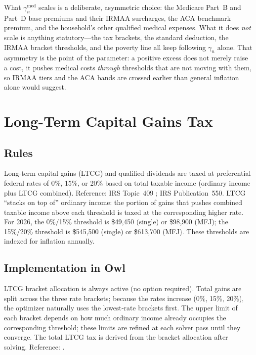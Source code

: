 \documentclass[fleqn,12pt]{report}
\begin{document}
What $\gamma^{\mathrm{med}}_n$ scales is a deliberate, asymmetric choice: the
Medicare Part~B and Part~D base premiums and their IRMAA surcharges, the ACA
benchmark premium, and the household's other qualified medical expenses.
What it does \emph{not} scale is anything statutory---the tax brackets, the
standard deduction, the IRMAA bracket thresholds, and the poverty line all keep
following $\gamma_n$ alone.
That asymmetry is the point of the parameter: a positive excess does not merely
raise a cost, it pushes medical costs \emph{through} thresholds that are not
moving with them, so IRMAA tiers and the ACA bands are crossed earlier than
general inflation alone would suggest.

\section{Long-Term Capital Gains Tax}
\label{sec:ltcg}

\subsection*{Rules}

Long-term capital gains (LTCG) and qualified dividends are taxed at
preferential federal rates of 0\%, 15\%, or 20\% based on total taxable
income (ordinary income plus LTCG combined).
Reference: IRS Topic~409 \cite{irs409}; IRS Publication~550.
LTCG ``stacks on top of'' ordinary income: the portion of gains that pushes
combined taxable income above each threshold is taxed at the corresponding
higher rate.
For 2026, the 0\%/15\% threshold is \$49,450 (single) or \$98,900 (MFJ);
the 15\%/20\% threshold is \$545,500 (single) or \$613,700 (MFJ).
These thresholds are indexed for inflation annually.

\subsection*{Implementation in Owl}

LTCG bracket allocation is always active (no option required).
Total gains are split across the three rate brackets; because the rates
increase (0\%, 15\%, 20\%), the optimizer naturally uses the lowest-rate
brackets first.
The upper limit of each bracket depends on how much ordinary income already
occupies the corresponding threshold; these limits are refined at each solver
pass until they converge.
The total LTCG tax is derived from the bracket allocation after solving.
Reference: \cite{irs409}.
\end{document}
